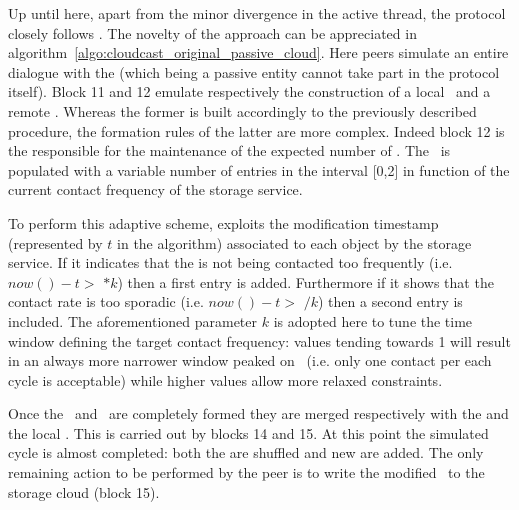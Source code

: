 Up until here, apart from the minor divergence in the active
thread, the protocol closely follows \cyclon. The novelty of the
approach can be appreciated in
algorithm~\ref{algo:cloudcast_original_passive_cloud}.
Here peers simulate an entire dialogue with the \cloud (which being
a passive entity cannot take part in the protocol
itself). Block 11 and 12 emulate respectively
the construction of a local \request\ and a remote \reply. Whereas
the former is built accordingly to the previously described procedure,
the formation rules of the latter are more complex. Indeed
block 12 is the responsible for the maintenance of the
expected number of \cloud \descriptors. The \reply\ is populated with
a variable number of \cloud entries in the interval [0,2] in function
of the current contact frequency of the storage service.

To perform this adaptive scheme, \cloudcast exploits the modification
timestamp (represented by $t$ in the algorithm) associated to each
object by the storage service. If it indicates that the \cloud is not
being contacted too frequently (i.e. $now() - t >$ \deltacyclon $* k$)
then a first entry is added. Furthermore if it shows that the contact
rate is too sporadic (i.e. $now() - t >$ \deltacyclon $/ k$) then a
second entry is included.
The aforementioned parameter $k$ is adopted here to tune the time
window defining the target contact frequency: values tending towards 1
will result in an always more narrower window peaked on \deltacyclon\
(i.e. only one contact per each \cyclon cycle is acceptable) while
higher values allow more relaxed constraints.

Once the \request\ and \reply\ are completely formed they are merged
respectively with the \cloud and the local \view. This is carried out by
blocks 14 and 15. At this point the
simulated cycle is almost completed: both the \views are shuffled and new
\descriptors are added. The only remaining action to be performed by
the peer is to write the modified \view\ to the storage cloud
(block 15).

